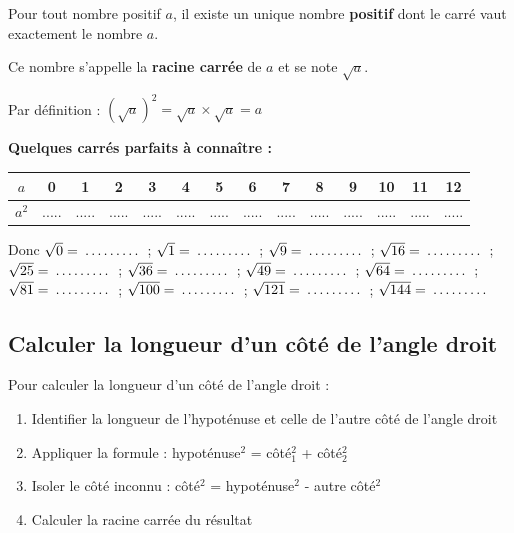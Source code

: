 \begin{proprietebox}
Pour tout nombre positif $a$, il existe un unique nombre \textbf{positif} dont le carré vaut exactement le nombre $a$.

Ce nombre s'appelle la \textbf{racine carrée} de $a$ et se note $\sqrt{a}$.

Par définition : $(\sqrt{a})^2 = \sqrt{a} \times \sqrt{a} = a$
\end{proprietebox}

\begin{examplebox}
\textbf{Quelques carrés parfaits à connaître :}

\begin{center}
\begin{tabular}{|c|c|c|c|c|c|c|c|c|c|c|c|c|c|}
\hline
$a$ & 0 & 1 & 2 & 3 & 4 & 5 & 6 & 7 & 8 & 9 & 10 & 11 & 12 \\
\hline
$a^2$ & ..... & ..... & ..... & ..... & ..... & ..... & ..... & ..... & ..... & ..... & ..... & ..... & ..... \\
\hline
\end{tabular}
\end{center}

Donc $\sqrt{0} = \trous{1.5cm}$ ; $\sqrt{1} = \trous{1.5cm}$ ; $\sqrt{9} = \trous{1.5cm}$ ; $\sqrt{16} = \trous{1.5cm}$ ; $\sqrt{25} = \trous{1.5cm}$ ; $\sqrt{36} = \trous{1.5cm}$ ; $\sqrt{49} = \trous{1.5cm}$ ; $\sqrt{64} = \trous{1.5cm}$ ;\\ $\sqrt{81} = \trous{1.5cm}$ ; $\sqrt{100} = \trous{1.5cm}$ ; $\sqrt{121} = \trous{1.5cm}$ ; $\sqrt{144} = \trous{1.5cm}$
\end{examplebox}


\subsection{Calculer la longueur d'un côté de l'angle droit}

\begin{methodebox}
Pour calculer la longueur d'un côté de l'angle droit :
\begin{enumerate}
    \item Identifier la longueur de l'hypoténuse et celle de l'autre côté de l'angle droit
    \item Appliquer la formule : hypoténuse$^2$ = côté$_1^2$ + côté$_2^2$
    \item Isoler le côté inconnu : côté$^2$ = hypoténuse$^2$ - autre côté$^2$
    \item Calculer la racine carrée du résultat
\end{enumerate}
\end{methodebox}

